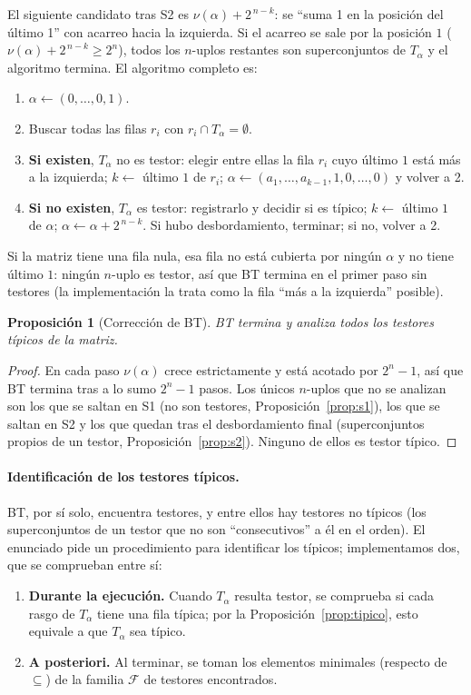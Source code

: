 \documentclass[11pt, a4paper]{article}
\theoremstyle{definition}
\theoremstyle{plain}
\newtheorem{proposicion}{Proposición}
\begin{document}
El siguiente candidato tras S2 es $\nu(\alpha)+2^{\,n-k}$: se ``suma 1 en la
posición del último 1'' con acarreo hacia la izquierda. Si el acarreo se sale por
la posición $1$ ($\nu(\alpha)+2^{\,n-k}\ge 2^n$), todos los $n$-uplos restantes son
superconjuntos de $T_\alpha$ y el algoritmo termina. El algoritmo completo es:

\begin{enumerate}[nosep]
\item $\alpha\leftarrow(0,\dots,0,1)$.
\item Buscar todas las filas $r_i$ con $r_i\cap T_\alpha=\emptyset$.
\item \textbf{Si existen}, $T_\alpha$ no es testor: elegir entre ellas la fila $r_i$
  cuyo último $1$ está más a la izquierda; $k\leftarrow$ último $1$ de $r_i$;
  $\alpha\leftarrow(a_1,\dots,a_{k-1},1,0,\dots,0)$ y volver a 2.
\item \textbf{Si no existen}, $T_\alpha$ es testor: registrarlo y decidir si es típico;
  $k\leftarrow$ último $1$ de $\alpha$; $\alpha\leftarrow\alpha+2^{\,n-k}$. Si hubo
  desbordamiento, terminar; si no, volver a 2.
\end{enumerate}
Si la matriz tiene una fila nula, esa fila no está cubierta por ningún $\alpha$ y
no tiene último $1$: ningún $n$-uplo es testor, así que BT termina en el primer
paso sin testores (la implementación la trata como la fila ``más a la
izquierda'' posible).

\begin{proposicion}[Corrección de BT]\label{prop:btcorrecto}
BT termina y analiza todos los testores típicos de la matriz.
\end{proposicion}
\begin{proof}
En cada paso $\nu(\alpha)$ crece estrictamente y está acotado por $2^n-1$, así que
BT termina tras a lo sumo $2^n-1$ pasos. Los únicos $n$-uplos que no se analizan son
los que se saltan en S1 (no son testores, Proposición~\ref{prop:s1}), los que se
saltan en S2 y los que quedan tras el desbordamiento final (superconjuntos propios
de un testor, Proposición~\ref{prop:s2}). Ninguno de ellos es testor típico.
\end{proof}

\paragraph{Identificación de los testores típicos.} BT, por sí solo, encuentra
testores, y entre ellos hay testores no típicos (los superconjuntos de un testor
que no son ``consecutivos'' a él en el orden). El enunciado pide un procedimiento
para identificar los típicos; implementamos dos, que se comprueban entre sí:
\begin{enumerate}[nosep]
\item \textbf{Durante la ejecución.} Cuando $T_\alpha$ resulta testor, se comprueba
  si cada rasgo de $T_\alpha$ tiene una fila típica; por la
  Proposición~\ref{prop:tipico}, esto equivale a que $T_\alpha$ sea típico.
\item \textbf{A posteriori.} Al terminar, se toman los elementos minimales (respecto
  de $\subseteq$) de la familia $\mathcal F$ de testores encontrados.
\end{enumerate}
\end{document}
